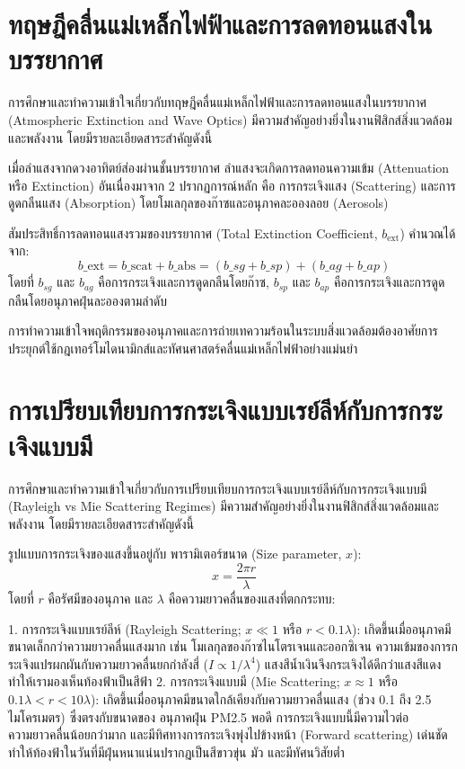 
\section{ทฤษฎีคลื่นแม่เหล็กไฟฟ้าและการลดทอนแสงในบรรยากาศ}

การศึกษาและทำความเข้าใจเกี่ยวกับทฤษฎีคลื่นแม่เหล็กไฟฟ้าและการลดทอนแสงในบรรยากาศ (Atmospheric Extinction and Wave Optics) มีความสำคัญอย่างยิ่งในงานฟิสิกส์สิ่งแวดล้อมและพลังงาน โดยมีรายละเอียดสาระสำคัญดังนี้

เมื่อลำแสงจากดวงอาทิตย์ส่องผ่านชั้นบรรยากาศ ลำแสงจะเกิดการลดทอนความเข้ม (Attenuation หรือ Extinction) อันเนื่องมาจาก 2 ปรากฏการณ์หลัก คือ การกระเจิงแสง (Scattering) และการดูดกลืนแสง (Absorption) โดยโมเลกุลของก๊าซและอนุภาคละอองลอย (Aerosols)

สัมประสิทธิ์การลดทอนแสงรวมของบรรยากาศ (Total Extinction Coefficient, $b_{\text{ext}}$) คำนวณได้จาก:
\[ b\_{\text{ext}} = b\_{\text{scat}} + b\_{\text{abs}} = (b\_{sg} + b\_{sp}) + (b\_{ag} + b\_{ap}) \]
โดยที่ $b_{sg}$ และ $b_{ag}$ คือการกระเจิงและการดูดกลืนโดยก๊าซ, $b_{sp}$ และ $b_{ap}$ คือการกระเจิงและการดูดกลืนโดยอนุภาคฝุ่นละอองตามลำดับ

\begin{physbox}
การทำความเข้าใจพฤติกรรมของอนุภาคและการถ่ายเทความร้อนในระบบสิ่งแวดล้อมต้องอาศัยการประยุกต์ใช้กฎเทอร์โมไดนามิกส์และทัศนศาสตร์คลื่นแม่เหล็กไฟฟ้าอย่างแม่นยำ
\end{physbox}

\section{การเปรียบเทียบการกระเจิงแบบเรย์ลีห์กับการกระเจิงแบบมี}

การศึกษาและทำความเข้าใจเกี่ยวกับการเปรียบเทียบการกระเจิงแบบเรย์ลีห์กับการกระเจิงแบบมี (Rayleigh vs Mie Scattering Regimes) มีความสำคัญอย่างยิ่งในงานฟิสิกส์สิ่งแวดล้อมและพลังงาน โดยมีรายละเอียดสาระสำคัญดังนี้

รูปแบบการกระเจิงของแสงขึ้นอยู่กับ พารามิเตอร์ขนาด (Size parameter, $x$):
\[ x = \frac{2\pi r}{\lambda} \]
โดยที่ $r$ คือรัศมีของอนุภาค และ $\lambda$ คือความยาวคลื่นของแสงที่ตกกระทบ:

1. การกระเจิงแบบเรย์ลีห์ (Rayleigh Scattering; $x \ll 1$ หรือ $r < 0.1\lambda$): เกิดขึ้นเมื่ออนุภาคมีขนาดเล็กกว่าความยาวคลื่นแสงมาก เช่น โมเลกุลของก๊าซไนโตรเจนและออกซิเจน ความเข้มของการกระเจิงแปรผกผันกับความยาวคลื่นยกกำลังสี่ ($I \propto 1/\lambda^4$) แสงสีน้ำเงินจึงกระเจิงได้ดีกว่าแสงสีแดง ทำให้เรามองเห็นท้องฟ้าเป็นสีฟ้า
2. การกระเจิงแบบมี (Mie Scattering; $x \approx 1$ หรือ $0.1\lambda < r < 10\lambda$): เกิดขึ้นเมื่ออนุภาคมีขนาดใกล้เคียงกับความยาวคลื่นแสง (ช่วง 0.1 ถึง 2.5 ไมโครเมตร) ซึ่งตรงกับขนาดของ อนุภาคฝุ่น PM2.5 พอดี การกระเจิงแบบนี้มีความไวต่อความยาวคลื่นน้อยกว่ามาก และมีทิศทางการกระเจิงพุ่งไปข้างหน้า (Forward scattering) เด่นชัด ทำให้ท้องฟ้าในวันที่มีฝุ่นหนาแน่นปรากฏเป็นสีขาวขุ่น มัว และมีทัศนวิสัยต่ำ


